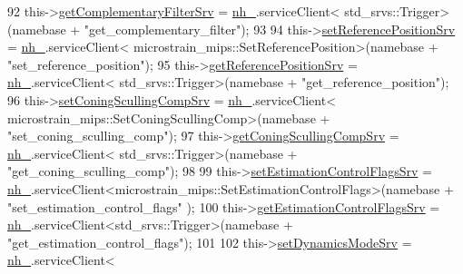 \begin{DoxyCode}
92                 this->\hyperlink{classcl__microstrain__mips_1_1ClMicrostainMips_a39aa3d9d1bbe86d90548f7422aa0b4a4}{getComplementaryFilterSrv} = \hyperlink{classcl__microstrain__mips_1_1ClMicrostainMips_a5a39ba0864ba2c4c003b6ea427538243}{nh\_}.serviceClient<
      std\_srvs::Trigger>(namebase + \textcolor{stringliteral}{"get\_complementary\_filter"});
93 
94                 this->\hyperlink{classcl__microstrain__mips_1_1ClMicrostainMips_a778117029f93a6cff9c5e2a0dac9742b}{setReferencePositionSrv} = \hyperlink{classcl__microstrain__mips_1_1ClMicrostainMips_a5a39ba0864ba2c4c003b6ea427538243}{nh\_}.serviceClient<
      microstrain\_mips::SetReferencePosition>(namebase + \textcolor{stringliteral}{"set\_reference\_position"});
95                 this->\hyperlink{classcl__microstrain__mips_1_1ClMicrostainMips_a1f9b56f826c67a2e1d8a33e0879053bc}{getReferencePositionSrv} = \hyperlink{classcl__microstrain__mips_1_1ClMicrostainMips_a5a39ba0864ba2c4c003b6ea427538243}{nh\_}.serviceClient<
      std\_srvs::Trigger>(namebase + \textcolor{stringliteral}{"get\_reference\_position"});
96                 this->\hyperlink{classcl__microstrain__mips_1_1ClMicrostainMips_ae24545c615e2be170adced3999d94d84}{setConingScullingCompSrv} = \hyperlink{classcl__microstrain__mips_1_1ClMicrostainMips_a5a39ba0864ba2c4c003b6ea427538243}{nh\_}.serviceClient<
      microstrain\_mips::SetConingScullingComp>(namebase + \textcolor{stringliteral}{"set\_coning\_sculling\_comp"});
97                 this->\hyperlink{classcl__microstrain__mips_1_1ClMicrostainMips_a877393b5cf4c313e0e433e9c92163265}{getConingScullingCompSrv} = \hyperlink{classcl__microstrain__mips_1_1ClMicrostainMips_a5a39ba0864ba2c4c003b6ea427538243}{nh\_}.serviceClient<
      std\_srvs::Trigger>(namebase + \textcolor{stringliteral}{"get\_coning\_sculling\_comp"});
98 
99                 this->\hyperlink{classcl__microstrain__mips_1_1ClMicrostainMips_a2eeff01aea4a41fd5d24ff2f77daf584}{setEstimationControlFlagsSrv} = 
      \hyperlink{classcl__microstrain__mips_1_1ClMicrostainMips_a5a39ba0864ba2c4c003b6ea427538243}{nh\_}.serviceClient<microstrain\_mips::SetEstimationControlFlags>(namebase + \textcolor{stringliteral}{"set\_estimation\_control\_flags"}
      );
100                 this->\hyperlink{classcl__microstrain__mips_1_1ClMicrostainMips_a64039ee26cf8a290b3c22b787b8868a5}{getEstimationControlFlagsSrv} = 
      \hyperlink{classcl__microstrain__mips_1_1ClMicrostainMips_a5a39ba0864ba2c4c003b6ea427538243}{nh\_}.serviceClient<std\_srvs::Trigger>(namebase + \textcolor{stringliteral}{"get\_estimation\_control\_flags"});
101 
102                 this->\hyperlink{classcl__microstrain__mips_1_1ClMicrostainMips_a43a684f4010debc4a2ba17d9784712d6}{setDynamicsModeSrv} = \hyperlink{classcl__microstrain__mips_1_1ClMicrostainMips_a5a39ba0864ba2c4c003b6ea427538243}{nh\_}.serviceClient<

\end{DoxyCode}
